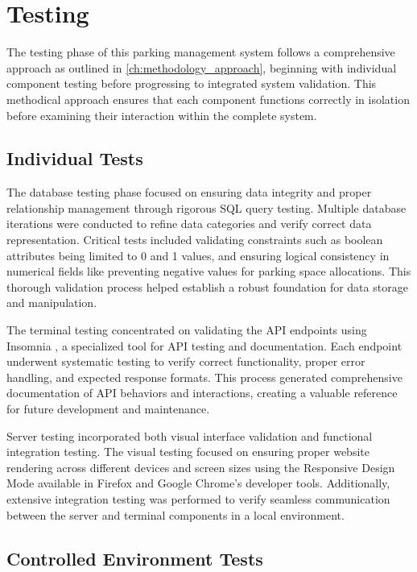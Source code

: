 \chapter{Testing}\label{ch:testing}

The testing phase of this parking management system follows a comprehensive approach as outlined in \cref{ch:methodology_approach}, beginning with individual component testing before progressing to integrated system validation. This methodical approach ensures that each component functions correctly in isolation before examining their interaction within the complete system.


\section{Individual Tests}

The database testing phase focused on ensuring data integrity and proper relationship management through rigorous SQL query testing. Multiple database iterations were conducted to refine data categories and verify correct data representation. Critical tests included validating constraints such as boolean attributes being limited to 0 and 1 values, and ensuring logical consistency in numerical fields like preventing negative values for parking space allocations. This thorough validation process helped establish a robust foundation for data storage and manipulation.

The terminal testing concentrated on validating the API endpoints using Insomnia \autocite{insomnia2025}, a specialized tool for API testing and documentation. Each endpoint underwent systematic testing to verify correct functionality, proper error handling, and expected response formats. This process generated comprehensive documentation of API behaviors and interactions, creating a valuable reference for future development and maintenance.

Server testing incorporated both visual interface validation and functional integration testing. The visual testing focused on ensuring proper website rendering across different devices and screen sizes using the Responsive Design Mode available in Firefox and Google Chrome's developer tools. Additionally, extensive integration testing was performed to verify seamless communication between the server and terminal components in a local environment.

\section{Controlled Environment Tests}

